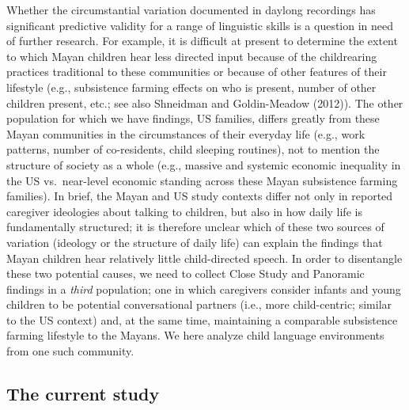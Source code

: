 \documentclass[,man,floatsintext]{apa6}
\begin{document}
Whether the circumstantial variation documented in daylong recordings
has significant predictive validity for a range of linguistic skills is
a question in need of further research. For example, it is difficult at
present to determine the extent to which Mayan children hear less
directed input because of the childrearing practices traditional to
these communities or because of other features of their lifestyle (e.g.,
subsistence farming effects on who is present, number of other children
present, etc.; see also Shneidman and Goldin-Meadow (2012)). The other
population for which we have findings, US families, differs greatly from
these Mayan communities in the circumstances of their everyday life
(e.g., work patterns, number of co-residents, child sleeping routines),
not to mention the structure of society as a whole (e.g., massive and
systemic economic inequality in the US vs.~near-level economic standing
across these Mayan subsistence farming families). In brief, the Mayan
and US study contexts differ not only in reported caregiver ideologies
about talking to children, but also in how daily life is fundamentally
structured; it is therefore unclear which of these two sources of
variation (ideology or the structure of daily life) can explain the
findings that Mayan children hear relatively little child-directed
speech. In order to disentangle these two potential causes, we need to
collect Close Study and Panoramic findings in a \emph{third} population;
one in which caregivers consider infants and young children to be
potential conversational partners (i.e., more child-centric; similar to
the US context) and, at the same time, maintaining a comparable
subsistence farming lifestyle to the Mayans. We here analyze child
language environments from one such community.

\subsection{The current study}\label{the-current-study}
\end{document}
